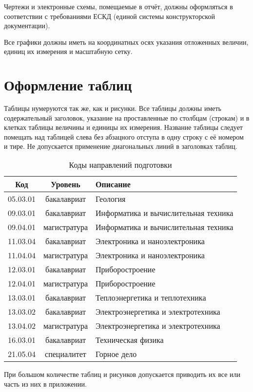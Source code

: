 \documentclass[utf8,12pt, coursreport]{G7-32}
\begin{document}
Чертежи и электронные схемы, помещаемые в отчёт, должны оформляться в соответствии с требованиями ЕСКД (единой системы конструкторской документации).

Все графики должны иметь на координатных осях указания отложенных величин, единиц их измерения и масштабную сетку.

\section{Оформление таблиц}

Таблицы нумеруются так же, как и рисунки. Все таблицы должны иметь содержательный заголовок, указание на проставленные по столбцам (строкам) и в клетках таблицы величины и единицы их измерения. Название таблицы следует помещать над таблицей слева без абзацного отступа в одну строку с её номером и тире. Не допускается применение диагональных линий в заголовках таблиц.

\begin{table}[h]
\caption{Коды направлений подготовки \cite{bachcodes, mastercodes}}
\begin{tabular}{|c|c|p{80mm}|}
\hline
Код & Уровень & Описание\\
\hline
05.03.01 & бакалавриат & Геология\\
09.03.01 & бакалавриат & Информатика и вычислительная техника\\
09.04.01 & магистратура & Информатика и вычислительная техника\\
11.03.04 & бакалавриат & Электроника и наноэлектроника\\
11.04.04 & магистратура & Электроника и наноэлектроника\\
12.03.01 & бакалавриат & Приборостроение\\
12.04.01 & магистратура & Приборостроение\\
13.03.01 & бакалавриат & Теплоэнергетика и теплотехника\\
13.03.02 & бакалавриат & Электроэнергетика и электротехника\\
13.04.02 & магистратура & Электроэнергетика и электротехника\\
16.03.01 & бакалавриат & Техническая физика\\
21.05.04 & специалитет & Горное дело\\
\hline
\end{tabular}
\end{table}

При большом количестве таблиц и рисунков допускается приводить их все или часть из них в приложении.
\end{document}
